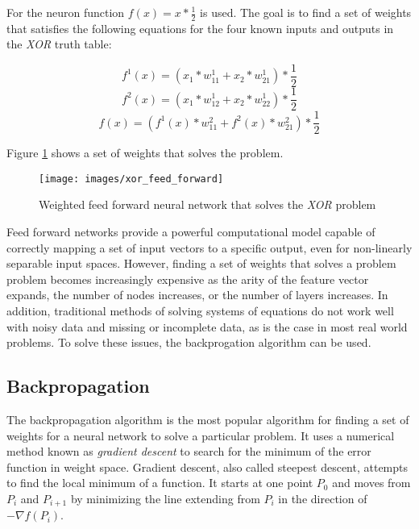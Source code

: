 For the neuron function $f(x) = x * \frac{1}{2}$ is used.
The goal is to find a set of weights that satisfies the following
equations for the four known inputs and outputs in the {\it XOR} truth
table:

\begin{displaymath}
f^1(x) = (x_1 * w_{11}^1 + x_2 * w_{21}^1) * \frac{1}{2}
\end{displaymath}
\begin{displaymath}
f^2(x) = (x_1 * w_{12}^1 + x_2 * w_{22}^1) * \frac{1}{2}
\end{displaymath}
\begin{displaymath}
f(x) = (f^1(x) * w_{11}^2 + f^2(x) * w_{21}^2) * \frac{1}{2}
\end{displaymath}

Figure \ref{xff} shows a set of weights that solves the problem.

\begin{figure}[h!]
  \centering
  \texttt{[image: images/xor\_feed\_forward]}
  \caption{Weighted feed forward neural network that solves the {\it XOR}
    problem}
  \label{xff}
\end{figure}

Feed forward networks provide a powerful computational model capable
of correctly mapping a set of input vectors to a specific output, even
for non-linearly separable input spaces.
However, finding a set of weights that solves a problem
problem becomes increasingly expensive as the arity of the feature
vector expands, the number of nodes increases, or the number of layers
increases.
In addition, traditional methods of solving systems of equations do not work
well with noisy data and missing or incomplete data, as is the case in most real world problems.
To solve these issues, the backprogation algorithm can be used.

\subsection{Backpropagation}

The backpropagation algorithm is the most popular algorithm for
finding a set of weights for a neural network to solve a particular
problem.
It uses a numerical method known as {\it gradient descent} to search
for the minimum of the error function in weight space.
Gradient descent, also called steepest descent, attempts to find the
local minimum of a function.
It starts at one point $P_0$ and moves from $P_i$ and $P_{i+1}$ by
minimizing the line extending from $P_i$ in the direction of $- \nabla
f(P_i)$\cite{gradient}.

